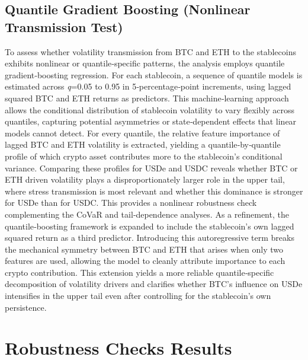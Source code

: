 \documentclass[12pt,a4paper,titlepage,oneside,english]{article}
\begin{document}
\subsection{Quantile Gradient Boosting (Nonlinear Transmission Test)}
To assess whether volatility transmission from BTC and ETH to the stablecoins exhibits nonlinear or quantile‑specific patterns, the analysis employs quantile gradient‑boosting regression. For each stablecoin, a sequence of quantile models is estimated across \textit{q}=0.05 to 0.95 in 5‑percentage‑point increments, using lagged squared BTC and ETH returns as predictors. This machine‑learning approach allows the conditional distribution of stablecoin volatility to vary flexibly across quantiles, capturing potential asymmetries or state‑dependent effects that linear models cannot detect. For every quantile, the relative feature importance of lagged BTC and ETH volatility is extracted, yielding a quantile‑by‑quantile profile of which crypto asset contributes more to the stablecoin’s conditional variance. Comparing these profiles for USDe and USDC reveals whether BTC or ETH driven volatility plays a disproportionately larger role in the upper tail, where stress transmission is most relevant and whether this dominance is stronger for USDe than for USDC. This provides a nonlinear robustness check complementing the CoVaR and tail‑dependence analyses.
As a refinement, the quantile‑boosting framework is expanded to include the stablecoin’s own lagged squared return as a third predictor. Introducing this autoregressive term breaks the mechanical symmetry between BTC and ETH that arises when only two features are used, allowing the model to cleanly attribute importance to each crypto contribution. This extension yields a more reliable quantile‑specific decomposition of volatility drivers and clarifies whether BTC’s influence on USDe intensifies in the upper tail even after controlling for the stablecoin’s own persistence.

\section{Robustness Checks Results}
\end{document}

